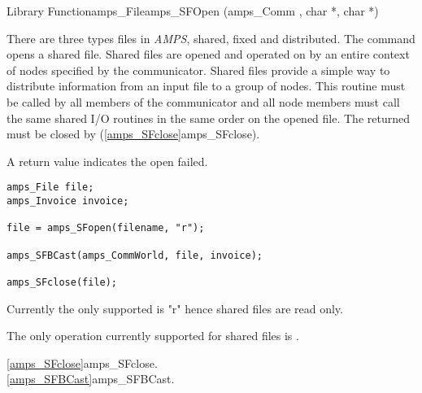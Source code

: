 
\begin{deftypefn}{Library Function}{amps_File}{amps\_SFOpen}
(amps_Comm , char *, char *)

\DESCRIPTION

There are three types files in {\em AMPS}, shared, fixed and distributed.  The
 command opens a shared file.  Shared files are opened
and operated on by an entire context of nodes specified by the
 communicator.  Shared files provide a simple way to distribute
information from an input file to a group of nodes.  This routine must
be called by all members of the communicator and all node members must
call the same shared I/O routines in the same order on the opened file.
The returned  must be closed by 
(\vref{amps_SFclose}{amps\_SFclose}).

A  return value indicates the open failed.

\EXAMPLE

\begin{display}\begin{verbatim}
amps_File file;
amps_Invoice invoice;

file = amps_SFopen(filename, "r");

amps_SFBCast(amps_CommWorld, file, invoice);

amps_SFclose(file);
\end{verbatim}\end{display}

\NOTES

Currently the only supported  is "r" hence shared files
are read only.

The only operation currently supported for shared files is
.

\SEEALSO
\vref{amps_SFclose}{amps\_SFclose}. \\
\vref{amps_SFBCast}{amps\_SFBCast}. \\

\end{deftypefn}

